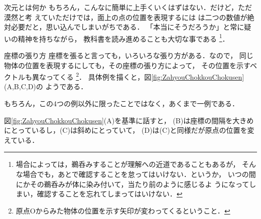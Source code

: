 \begin{memo}{次元とは何か}
                もちろん，こんなに簡単に上手くいくはずはない．だけど，ただ漠然と考
                えていただけでは，面上の点の位置を表現するには
                は二つの数値が絶対必要だと，思い込んでしまいがちである．
                「本当にそうだろうか」と常に疑いの精神を持ちながら，
                教科書を読み進めることも大切な事である
                    \footnote{
                        場合によっては，鵜呑みすることが理解への近道であることもあるが，
                        そんな場合でも，あとで確認することを怠ってはいけない．というか，
                        いつの間にかその鵜呑みが体に染み付いて，当たり前のように感じるよ
                        うになってしまい，確認することを忘れてしまってはいけない．
                    }．
            \end{memo}

            \begin{memo}{座標の張り方}
                座標を張ると言っても，いろいろな張り方がある．なので，
                同じ物体の位置を表現するにしても，その座標の張り方によって，
                その位置を示すベクトルも異なってくる
                    \footnote{
                        原点Oからみた物体の位置を示す矢印が変わってくるということ．
                    }．
                具体例を描くと，図\ref{fig:ZahyouChokkouChokusen}(A,B,C,D)の
                ようである．

                もちろん，この4つの例以外に限ったことではなく，あくまで一例である．

                図\ref{fig:ZahyouChokkouChokusen}(A)を基準に話すと，
                (B)は座標の間隔を大きめにとっているし，(C)は斜めにとっていて，
                (D)は(C)と同様だが原点の位置を変えている．


\end{memo}
